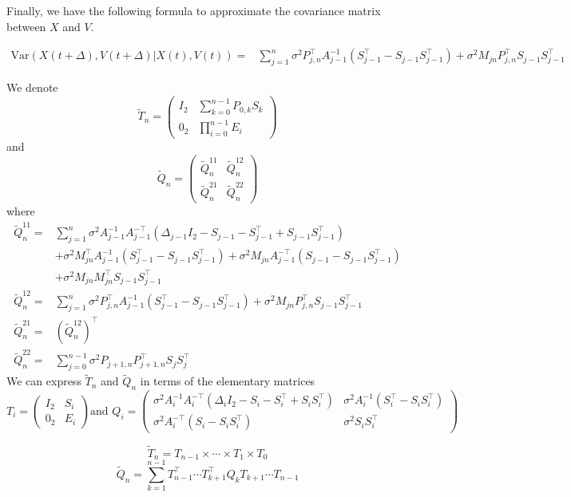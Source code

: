 \documentclass[aoas]{imsart}
\theoremstyle{definition}
\theoremstyle{remark}
\theoremstyle{remark}
\newcommand {\1}{\mathbb{1}}
\begin{document}
Finally, we have the following formula to approximate the covariance matrix between $X$ and $V$.

\begin{align*}
	\mbox{Var}(X(t+\Delta),V(t+\Delta) \vert X(t),V(t))=& \sum_{j=1}^n \sigma^2 P_{j,n}^\top A_{j-1}^{-1}(S_{j-1}^\top-S_{j-1} S_{j-1}^\top)  
	+\sigma^2 M_{jn} P_{j,n}^\top S_{j-1} S_{j-1}^\top 
\end{align*}

We denote
\[\tilde{T}_n=\begin{pmatrix} I_2 & \sum_{k=0}^{n-1} P_{0,k} S_k \\
	0_2  &  \prod_{i=0}^{n-1}  E_i \end{pmatrix}
\]
and \[\tilde{Q}_n = \begin{pmatrix}  \tilde{Q}_n^{11}& \tilde{Q}_n^{12} \\
	\tilde{Q}_n^{21}& \tilde{Q}_n^{22} \end{pmatrix}\]
where 
\begin{align*}
	\tilde{Q}_n ^{11}=&\sum_{j=1}^n \sigma^2 A_{j-1}^{-1} A_{j-1}^{-\top}(\Delta_{j-1} I_2-S_{j-1}-S_{j-1}^\top + S_{j-1}S_{j-1}^\top) \\
	&+ \sigma^2  M_{jn}^\top A_{j-1}^{-1} (S_{j-1}^\top -S_{j-1} S_{j-1}^\top) + \sigma^2  M_{jn} A_{j-1}^{-\top} (S_{j-1} -S_{j-1} S_{j-1}^\top) \\
	&+\sigma^2M_{jn} M_{jn}^\top S_{j-1} S_{j-1}^\top \\
	\tilde{Q}_n ^{12}=&\sum_{j=1}^n \sigma^2 P_{j,n}^\top A_{j-1}^{-1}(S_{j-1}^\top-S_{j-1} S_{j-1}^\top)  
	+\sigma^2 M_{jn} P_{j,n}^\top S_{j-1} S_{j-1}^\top \\
	\tilde{Q}_n ^{21}=&(\tilde{Q}_n ^{12})^\top \\
	\tilde{Q}_n^{22} = & \sum_{j=0}^{n-1} \sigma^2 P_{j+1,n} P_{j+1,n}^\top S_j S_j^\top
\end{align*}
We can express $\tilde{T}_n$ and $\tilde{Q}_n$ in terms of the elementary matrices 
\[T_i=\begin{pmatrix} I_2 & S_i \\ 0_2 & E_i \end{pmatrix}  \mbox {and } 
Q_i=\begin{pmatrix} \sigma^2 A_i^{-1}A_i^{-\top} ( \Delta_iI_2-S_i-S_i^\top+S_iS_i^\top) & \sigma^2 A_i^{-1} (S_i^\top-S_iS_i^\top) \\
	\sigma^2 A_i^{-\top} (S_i-S_iS_i^\top) & \sigma^2 S_i S_i^\top
\end{pmatrix}
\]

\begin{equation}
	\tilde{T}_n = T_{n-1} \times \cdots \times T_1 \times T_0
	\label{eq: approximate link matrix}
\end{equation}
\begin{equation}
	\tilde{Q}_n= \sum_{k=1}^{n-1} T_{n-1}^\top \cdots T_{k+1}^\top Q_k T_{k+1} \cdots T_{n-1}
\end{equation}
\end{document}
